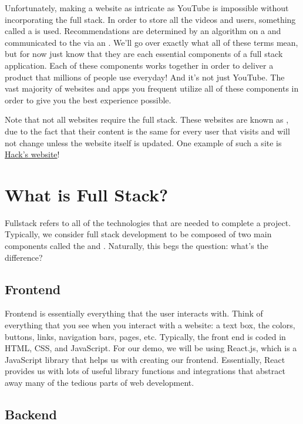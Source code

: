 Unfortunately, making a website as intricate as YouTube is impossible without incorporating the full stack. In order to store all the videos and users, something called a  is used. Recommendations are determined by an algorithm on a  and communicated to the  via an . We'll go over exactly what all of these terms mean, but for now just know that they are each essential components of a full stack application. Each of these components works together in order to deliver a product that millions of people use everyday! And it's not just YouTube. The vast majority of websites and apps you frequent utilize all of these components in order to give you the best experience possible.

Note that not all websites require the full stack. These websites are known as , due to the fact that their content is the same for every user that visits and will not change unless the website itself is updated. One example of such a site is \href{https://hack.uclaacm.com/}{Hack's website}!

\section{What is Full Stack?}

Fullstack refers to all of the technologies that are needed to complete a project. Typically, we consider full stack development to be composed of two main components called the  and . Naturally, this begs the question: what's the difference?

\subsection*{Frontend}

Frontend is essentially everything that the user interacts with. Think of everything that you see when you interact with a website: a text box, the colors, buttons, links, navigation bars, pages, etc. Typically, the front end is coded in HTML, CSS, and JavaScript. For our demo, we will be using React.js, which is a JavaScript library that helps us with creating our frontend. Essentially, React provides us with lots of useful library functions and integrations that abstract away many of the tedious parts of web development. 

\subsection*{Backend}

